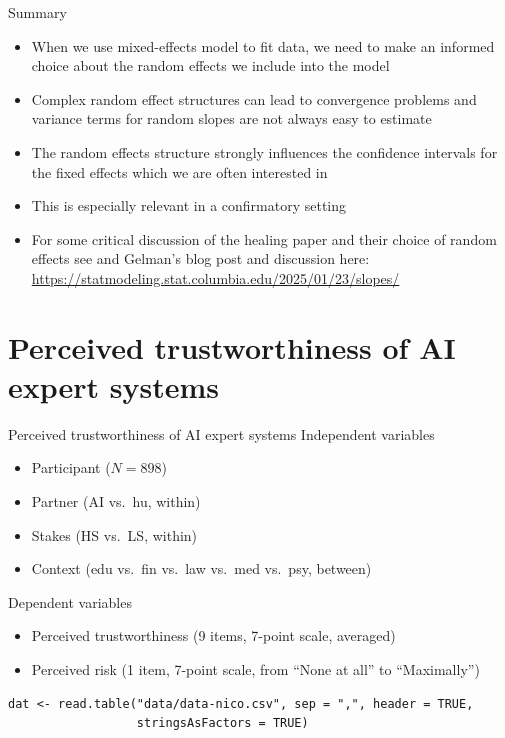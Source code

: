 \documentclass[aspectratio=169]{beamer}
\begin{document}
\begin{frame}[<+->]{Summary}
  \begin{itemize}
    \item When we use mixed-effects model to fit data, we need to make an
      informed choice about the random effects we include into the model
    \item Complex random effect structures can lead to convergence problems and
      variance terms for random slopes are not always easy to estimate
    \item The random effects structure strongly influences the confidence
      intervals for the fixed effects which we are often interested in
    \item This is especially relevant in a confirmatory setting
    \item For some critical discussion of the healing paper and their choice of
      random effects see \citet{Gelman2024} and Gelman's blog post and
      discussion here:
      \url{https://statmodeling.stat.columbia.edu/2025/01/23/slopes/}
  \end{itemize}
\end{frame}

\section[AIES]{Perceived trustworthiness of AI expert systems}

\begin{frame}[fragile]{Perceived trustworthiness of AI expert systems}
  Independent variables
  \begin{itemize}
    \item Participant ($N = 898$)
    \item Partner (AI vs.\ hu, within)
    \item Stakes (HS vs.\ LS, within)
    \item Context (edu vs.\ fin vs.\ law vs.\ med vs.\ psy, between)
  \end{itemize}
  Dependent variables
  \begin{itemize}
    \item Perceived trustworthiness (9 items, 7-point scale, averaged)
    \item Perceived risk (1 item, 7-point scale, from ``None at all'' to
      ``Maximally'')
  \end{itemize}
  \begin{lstlisting}
dat <- read.table("data/data-nico.csv", sep = ",", header = TRUE,
                  stringsAsFactors = TRUE)
  \end{lstlisting}
\end{frame}
\end{document}

